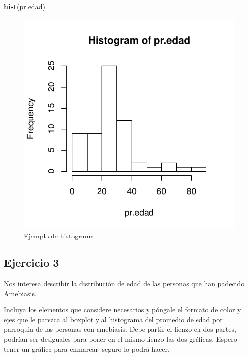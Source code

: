 \documentclass[]{article}
\newenvironment{Shaded}{\begin{snugshade}}{\end{snugshade}}
\newcommand{\KeywordTok}[1]{\textcolor[rgb]{0.13,0.29,0.53}{\textbf{{#1}}}}
\newcommand{\NormalTok}[1]{{#1}}
\begin{document}
\begin{Shaded}
\begin{Highlighting}[]
\KeywordTok{hist}\NormalTok{(pr.edad)}
\end{Highlighting}
\end{Shaded}

\begin{figure}

{\centering \includegraphics{index_files/figure-latex/unnamed-chunk-17-1} 

}

\caption{Ejemplo de histograma}\label{fig:unnamed-chunk-17}
\end{figure}

\subsection{Ejercicio 3}\label{ejercicio-3}

Nos interesa describir la distribución de edad de las personas que han
padecido Amebiasis.

Incluya los elementos que considere necesarios y póngale el formato de
color y ejes que le parezca al boxplot y al histograma del promedio de
edad por parroquia de las personas con amebiasis. Debe partir el lienzo
en dos partes, podrían ser desiguales para poner en el mismo lienzo las
dos gráficas. Espero tener un gráfico para enmarcar, seguro lo podrá
hacer.
\end{document}
